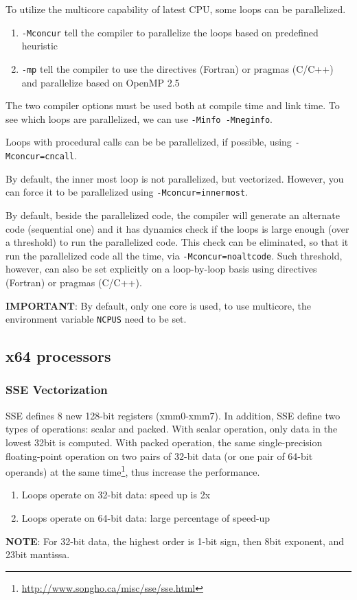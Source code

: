 To utilize the multicore capability of latest CPU, some loops can be
parallelized. 
\begin{enumerate}
\item \verb!-Mconcur! tell the compiler to parallelize the loops based
  on predefined heuristic
\item \verb!-mp! tell the compiler to use the directives (Fortran) or
  pragmas (C/C++) and parallelize based on OpenMP 2.5
\end{enumerate}
The two compiler options must be used both at compile time and link
time. To see which loops are parallelized, we can use
\verb!-Minfo -Mneginfo!.

Loops with procedural calls can be be parallelized, if possible, using
\verb!-Mconcur=cncall!. 

By default, the inner most loop is not parallelized, but
vectorized. However, you can force it to be parallelized using
\verb!-Mconcur=innermost!.

By default, beside the parallelized code, the compiler will generate
an alternate code (sequential one) and it has dynamics check if the
loops is large enough (over a threshold) to run the parallelized
code. This check can be eliminated, so that it run the parallelized
code all the time, via \verb!-Mconcur=noaltcode!.
Such threshold, however, can also be set explicitly on a loop-by-loop
basis using directives (Fortran) or pragmas (C/C++). 

{\bf IMPORTANT}: By default, only one core is used, to use multicore,
the environment variable \verb!NCPUS! need to be set.


\subsection{x64 processors}
\label{sec:x64-processors}

\subsubsection{SSE Vectorization}
\label{sec:sse-vectorization}

SSE defines 8 new 128-bit registers (xmm0-xmm7). In addition, SSE
define two types of operations: scalar and packed. With scalar
operation, only data in the lowest 32bit is computed. With packed
operation, the same single-precision floating-point operation on two
pairs of 32-bit data (or one pair of 64-bit operands) at the same
time\footnote{\url{http://www.songho.ca/misc/sse/sse.html}}, thus
increase the performance.
\begin{enumerate}
\item Loops operate on 32-bit data: speed up is 2x
\item Loops operate on 64-bit data: large percentage of speed-up
\end{enumerate}
{\bf NOTE}: For 32-bit data, the highest order is 1-bit sign, then
8bit exponent, and 23bit mantissa.

